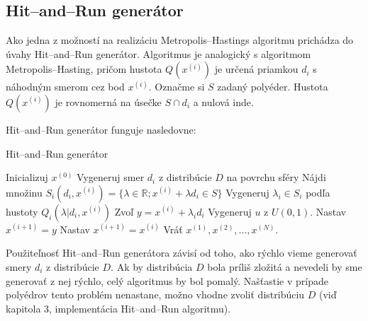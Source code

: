 \subsection{Hit--and--Run generátor}

Ako jedna z možností na realizáciu Metropolis--Hastings algoritmu prichádza do úvahy Hit--and--Run generátor. Algoritmus je analogický s algoritmom Metropolis--Hasting, pričom hustota $Q(x^{(i)})$ je určená priamkou $d_i$ s náhodným smerom cez bod $x^{(i)}$. Označme si $S$ zadaný polyéder. Hustota $Q(x^{(i)})$ je rovnomerná na úsečke $S \cap d_i$ a nulová inde.

Hit--and--Run generátor funguje nasledovne:

\begin{algorithm}[H]
	\caption{Hit--and--Run generátor \cite{hit-and-run_chen}}
	\label{hit--and--run}
	\begin{algorithmic}[1]
		\State Inicializuj $x^{(0)}$
			\State Vygeneruj smer $d_i$ z distribúcie $D$ na povrchu sféry
			\State Nájdi množinu $S_i(d_i,x^{(i)})=\{\lambda \in \mathbb{R}; x^{(i)} + \lambda d_i \in S \} $
			\State Vygeneruj $\lambda_i \in S_i$ podľa hustoty $Q_i(\lambda | d_i, x^{(i)})$
			\State Zvoľ $y=x^{(i)}+\lambda_i d_i$
			\State Vygeneruj $u$ z $U(0,1)$.
				\State Nastav $x^{(i+1)}=y$
			\Else
				\State Nastav $x^{(i+1)}=x^{(i)}$
			\EndIf
		\EndFor
		\State Vráť $x^{(1)},x^{(2)},\dots,x^{(N)}$.
	\end{algorithmic}
\end{algorithm}

Použiteľnosť Hit--and--Run generátora závisí od toho, ako rýchlo vieme generovať smery $d_i$ z distribúcie $D$. Ak by distribúcia $D$ bola príliš zložitá a nevedeli by sme generovať z nej rýchlo, celý algoritmus by bol pomalý.
Našťastie v prípade polyédrov tento problém nenastane, možno vhodne zvoliť distribúciu $D$ (viď kapitola 3, implementácia Hit--and--Run algoritmu).

